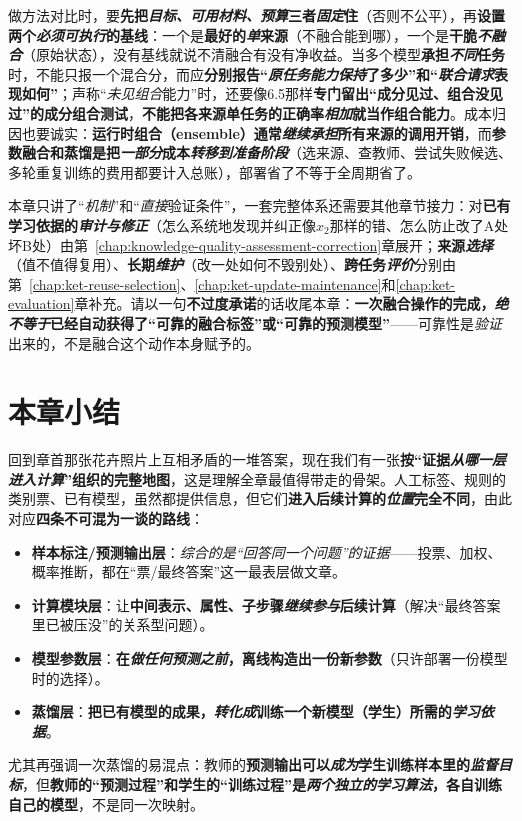 做方法对比时，要\textbf{先把\emph{目标、可用材料、预算}三者\emph{固定}住}（否则不公平），再\textbf{设置两个\emph{必须可执行}的基线}：一个是\textbf{最好的\emph{单}来源}（不融合能到哪），一个是\textbf{干脆\emph{不融合}}（原始状态），没有基线就说不清融合有没有净收益。当多个模型\textbf{承担\emph{不同}任务}时，不能只报一个混合分，而应\textbf{分别报告“\emph{原任务能力\emph{保持}}了多少”和“\emph{联合请求}表现如何”}；声称“\emph{未见组合}能力”时，还要像6.5那样\textbf{专门留出“成分见过、组合没见过”的成分组合测试}，\textbf{不能把各来源单任务的正确率\emph{相加}就当作组合能力}。成本归因也要诚实：\textbf{运行时组合（ensemble）通常\emph{继续承担}所有来源的调用开销}，而\textbf{参数融合和蒸馏是把\emph{一部分}成本\emph{转移到准备阶段}}（选来源、查教师、尝试失败候选、多轮重复训练的费用都要计入总账），部署省了不等于全周期省了。

本章只讲了“\emph{机制}”和“\emph{直接}验证条件”，一套完整体系还需要其他章节接力：对\textbf{已有学习依据的\emph{审计与修正}}（怎么系统地发现并纠正像$x_2$那样的错、怎么防止改了A处坏B处）由第~\ref{chap:knowledge-quality-assessment-correction}章展开；\textbf{来源\emph{选择}}（值不值得复用）、\textbf{长期\emph{维护}}（改一处如何不毁别处）、\textbf{跨任务\emph{评价}}分别由第~\ref{chap:ket-reuse-selection}、\ref{chap:ket-update-maintenance}和\ref{chap:ket-evaluation}章补充。请以一句\textbf{不过度承诺}的话收尾本章：\textbf{一次融合操作的完成，\emph{绝不等于}已经自动获得了“可靠的融合标签”或“可靠的预测模型”}——可靠性是\emph{验证}出来的，不是融合这个动作本身赋予的。

\section{本章小结}
\label{sec:knowledge-fusion-summary}
\label{sec:ket-integration-summary}

回到章首那张花卉照片上互相矛盾的一堆答案，现在我们有一张\textbf{按“证据\emph{从哪一层进入计算}”组织的完整地图}，这是理解全章最值得带走的骨架。人工标签、规则的类别票、已有模型，虽然都提供信息，但它们\textbf{进入后续计算的\emph{位置}完全不同}，由此对应\textbf{四条不可混为一谈的路线}：
\begin{itemize}\item \textbf{样本标注/预测输出层}：\emph{综合的是“回答\emph{同一个问题}”的证据}——投票、加权、概率推断，都在“票/最终答案”这一最表层做文章。\item \textbf{计算模块层}：让\textbf{中间表示、属性、子步骤\emph{继续参与}后续计算}（解决“最终答案里已被压没”的关系型问题）。\item \textbf{模型参数层}：\textbf{在\emph{做任何预测之前}，离线构造出一份新参数}（只许部署一份模型时的选择）。\item \textbf{蒸馏层}：\textbf{把已有模型的成果，\emph{转化成}训练一个新模型（学生）所需的\emph{学习依据}}。\end{itemize}
尤其再强调一次蒸馏的易混点：教师的\textbf{预测输出可以\emph{成为}学生训练样本里的\emph{监督目标}}，但\textbf{教师的“预测过程”和学生的“训练过程”是\emph{两个独立的学习算法}，各自训练自己的模型}，不是同一次映射。

